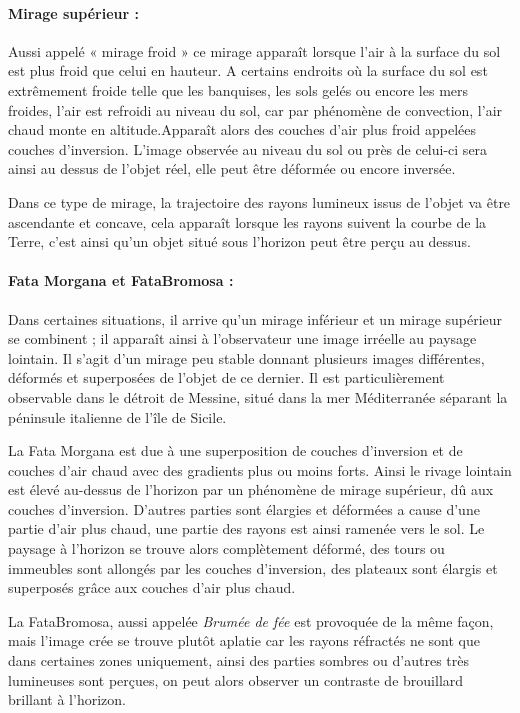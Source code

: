 \documentclass[a4paper, 12pt, onecolumn, openany]{report}
\begin{document}
\paragraph{Mirage supérieur :}
	Aussi appelé « mirage froid » ce mirage apparaît lorsque l’air à la surface du sol est plus froid que celui en hauteur.  A certains endroits où la surface du sol est extrêmement froide telle que les banquises, les sols gelés ou encore les mers froides, l’air est refroidi au niveau du sol, car par phénomène de convection, l’air chaud monte en altitude.Apparaît alors des couches d’air plus froid appelées couches d’inversion.  L’image observée au niveau du sol ou près de celui-ci sera ainsi au dessus de l’objet réel, elle peut être déformée ou encore inversée.
	
	Dans ce type de mirage, la trajectoire des rayons lumineux issus de l’objet va être ascendante et concave, cela apparaît lorsque les rayons suivent la courbe de la Terre, c’est ainsi qu’un objet situé sous l’horizon peut être perçu au dessus. 

\paragraph{Fata Morgana et FataBromosa :}
	Dans certaines situations, il arrive qu’un mirage inférieur et un mirage supérieur se combinent ; il apparaît ainsi à l’observateur une image irréelle au paysage lointain. 
	Il s’agit d’un mirage peu stable donnant plusieurs images différentes, déformés et superposées de l’objet de ce dernier. 
	Il est particulièrement observable dans le détroit de Messine, situé dans la mer Méditerranée séparant la péninsule italienne de l’île de Sicile. 
	
	La Fata Morgana est due à une superposition de couches d’inversion et de couches d’air chaud avec des gradients plus ou moins forts. Ainsi le rivage lointain est élevé au-dessus de l’horizon par un phénomène de mirage supérieur, dû aux couches d’inversion. D’autres parties sont élargies et déformées a cause d’une partie d’air plus chaud, une partie des rayons est ainsi ramenée vers le sol.  Le paysage à l’horizon se trouve alors complètement déformé, des tours ou immeubles sont allongés par les couches d’inversion, des plateaux sont élargis et superposés grâce aux couches d’air plus chaud. 
	
	La FataBromosa, aussi appelée \textit{Brumée de fée} est provoquée de la même façon, mais l’image crée se trouve plutôt aplatie car les rayons réfractés ne sont que dans certaines zones uniquement, ainsi des parties sombres ou d’autres très lumineuses sont perçues,  on peut alors observer un contraste de brouillard brillant à l’horizon. 
\end{document}
